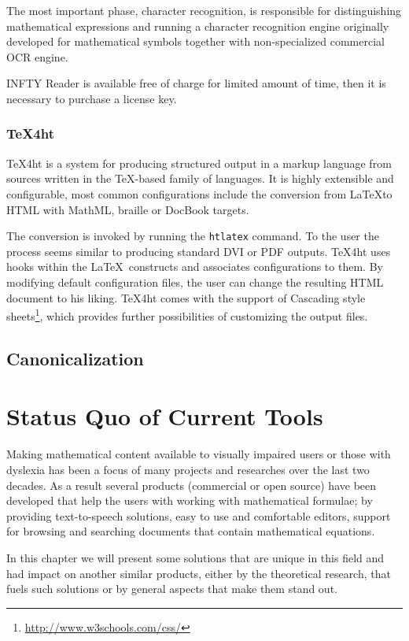 \documentclass[11pt,oneside,final]{fithesis2}
\begin{document}
The most important phase, character recognition, is responsible for distinguishing mathematical expressions and running a character recognition engine originally developed for mathematical symbols together with non-specialized commercial OCR engine. 

INFTY Reader is available free of charge for limited amount of time, then it is necessary to purchase a license key.

\subsection{\TeX 4ht}
\TeX 4ht\cite{tex4ht:gurari2004} is a system for producing structured output in a markup language from sources written in the \TeX -based family of languages. It is highly extensible and configurable, most common configurations include the conversion from \LaTeX to HTML with MathML, braille or DocBook targets.

The conversion is invoked by running the \texttt{htlatex} command. To the user the process seems similar to producing standard DVI or PDF outputs. \TeX 4ht uses hooks within the \LaTeX\ constructs and associates configurations to them. By modifying default configuration files, the user can change the resulting HTML document to his liking. \TeX 4ht comes with the support of Cascading style sheets\footnote{\url{http://www.w3schools.com/css/}}, which provides further possibilities of customizing the output files. 

\section{Canonicalization}


\chapter{Status Quo of Current Tools}
Making mathematical content available to visually impaired users or those with dyslexia has been a focus of many projects and researches over the last two decades. As a result several products (commercial or open source) have been developed that help the users with working with mathematical formulae; by providing text-to-speech solutions, easy to use and comfortable editors, support for browsing and searching documents that contain mathematical equations.

In this chapter we will present some solutions that are unique in this field and had impact on another similar products, either by the theoretical research, that fuels such solutions or by general aspects that make them stand out. 
\end{document}
